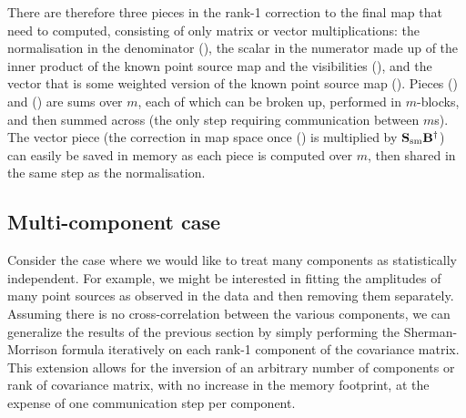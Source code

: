 There are therefore three pieces in the rank-1 correction to the final map that need to computed, consisting of only matrix or vector multiplications: the normalisation in the denominator (), the scalar in the numerator made up of the inner product of the known point source map and the visibilities (), and the vector that is some weighted version of the known point source map (). Pieces () and () are sums over $m$, each of which can be broken up, performed in $m$-blocks, and then summed across (the only step requiring communication between $m$s). The vector piece (the correction in map space once () is multiplied by $\mathbf{S}_{\rm sm}\mathbf{B}^{\dagger}$) can easily be saved in memory as each piece is computed over $m$, then shared in the same step as the normalisation.

\subsection{Multi-component case}
\label{sec:multicomponent}

Consider the case where we would like to treat many components as statistically independent. For example, we might be interested in fitting the amplitudes of many point sources as observed in the data and then removing them separately. Assuming there is no cross-correlation between the various components, we can generalize the results of the previous section by simply performing the Sherman-Morrison formula iteratively on each rank-1 component of the covariance matrix. This extension allows for the inversion of an arbitrary number of components or rank of covariance matrix, with no increase in the memory footprint, at the expense of one communication step per component.

